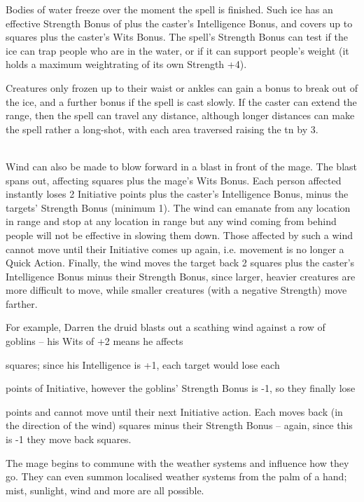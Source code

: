 \begin{multicols}{2}
Bodies of water freeze over the moment the spell is finished.
Such ice has an effective Strength Bonus of  plus the caster's Intelligence Bonus, and covers up to  squares plus the caster's Wits Bonus.
The spell's Strength Bonus can test if the ice can trap people who are in the water, or if it can support people's weight (it holds a maximum \gls{weightrating} of its own Strength +4).

Creatures only frozen up to their waist or ankles can gain a bonus to break out of the ice, and a further bonus if the spell is cast slowly.
If the caster can extend the range, then the spell can travel any distance, although longer distances can make the spell rather a long-shot, with each area traversed raising the \gls{tn} by 3.

\\
Wind can also be made to blow forward in a blast in front of the mage.
The blast spans out, affecting  squares plus the mage's Wits Bonus.
Each person affected instantly loses 2 Initiative points plus the caster's Intelligence Bonus, minus the targets' Strength Bonus (minimum 1).
The wind can emanate from any location in range and stop at any location in range but any wind coming from behind people will not be effective in slowing them down.
Those affected by such a wind cannot move until their Initiative comes up again, i.e. movement is no longer a Quick Action.
Finally, the wind moves the target back 2 squares plus the caster's Intelligence Bonus minus their Strength Bonus, since larger, heavier creatures are more difficult to move, while smaller creatures (with a negative Strength) move farther.

For example, Darren the druid blasts out a scathing wind against a row of goblins -- his Wits of +2 means he affects \setcounter{list}{2}\addtocounter{list}{\value{spelllevel}} squares; since his Intelligence is +1, each target would lose each \setcounter{enc}{1}\addtocounter{enc}{\value{spelllevel}} points of Initiative, however the goblins' Strength Bonus is -1, so they finally lose \addtocounter{enc}{1} points and cannot move until their next Initiative action.
Each moves back (in the direction of the wind)  squares minus their Strength Bonus -- again, since this is -1 they move back  squares.

\spelllevel

The mage begins to commune with the weather systems and influence how they go. They can even summon localised weather systems from the palm of a hand; mist, sunlight, wind and more are all possible.


\end{multicols}
